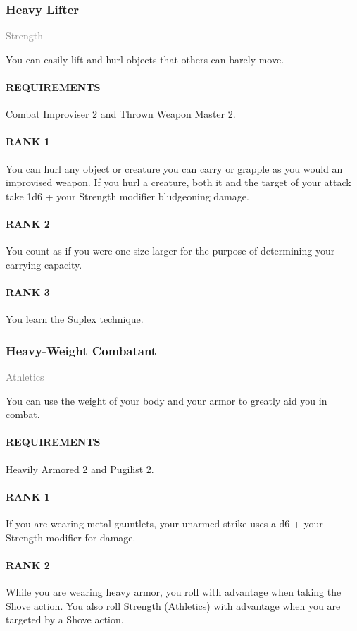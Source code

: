\subsubsection{Heavy Lifter} \label{feat::heavylifter}
\small{\textcolor{gray}{Strength}}

\normalsize
You can easily lift and hurl objects that others can barely move.
\paragraph{REQUIREMENTS} Combat Improviser 2 and Thrown Weapon Master 2.
\paragraph{RANK 1} You can hurl any object or creature you can carry or grapple as you would an improvised weapon.
If you hurl a creature, both it and the target of your attack take 1d6 + your Strength modifier bludgeoning damage.
\paragraph{RANK 2} You count as if you were one size larger for the purpose of determining your carrying capacity.
\paragraph{RANK 3} You learn the Suplex technique.

\subsubsection{Heavy-Weight Combatant} \label{feat::heavyweightcombatant}
\small{\textcolor{gray}{Athletics}}

\normalsize
You can use the weight of your body and your armor to greatly aid you in combat.
\paragraph{REQUIREMENTS} Heavily Armored 2 and Pugilist 2.
\paragraph{RANK 1} If you are wearing metal gauntlets, your unarmed strike uses a d6 + your Strength modifier for damage.
\paragraph{RANK 2} While you are wearing heavy armor, you roll with advantage when taking the Shove action.
You also roll Strength (Athletics) with advantage when you are targeted by a Shove action.
